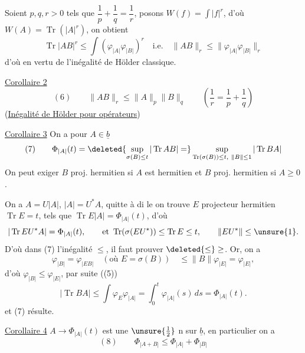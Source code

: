 Soient $p,q,r>0$ tels que $\dfrac1p+\dfrac1q=\dfrac1r$, posons
$W(f)=\int|f|^r$,  d'où
 $W(A)=\operatorname{Tr}(|A|^r)$,
on obtient
\[
\operatorname{Tr}|AB|^r\leq\int(\varphi_{|A|}\varphi_{|B|})^r
\quad\text{i.e.}\quad
\|AB\|_r\leq\|\varphi_{|A|}\varphi_{|B|}\|_r
\]
 d'où en vertu de l'inégalité de Hölder classique.

\uline{Corollaire 2}
\[
(6)\qquad\|AB\|_r\leq\|A\|_p\|B\|_q
\qquad\left(\frac1r=\frac1p+\frac1q\right)
\]
 (\uline{Inégalité de Hölder pour opérateurs})

\uline{Corollaire 3} 
On a pour $A\in\underline b$ 
\[
(7)\qquad\Phi_{|A|}(t)=
\deleted{\sup_{\sigma(B)\leq t}|\operatorname{Tr}AB|=}
\sup_{\operatorname{Tr}(\sigma(B))\leq t,\ \|B\|\leq1}|\operatorname{Tr}BA|
\]
On peut exiger $B$ proj. hermitien  si $A$ est hermitien
et $B$ proj. hermitien si $A\geq0$.

 On a $A=U|A|$, $|A|=U^*A$, quitte à di le  on trouve $E$ projecteur hermitien
$\operatorname{Tr}E=t$, tels que $\operatorname{Tr}E|A|=\Phi_{|A|}(t)$, d'où
\[
|\operatorname{Tr}EU^*A|=\Phi_{|A|}(t),\qquad
\text{et }\operatorname{Tr}(\sigma(EU^*))\leq\operatorname{Tr}E\leq t,
\qquad \|EU^*\|\leq\unsure{1}.
\]
D'où dans (7) l'inégalité $\leq$, il faut prouver $\deleted{\leq}\geq$.
Or, on a 
\[
\varphi_{|B|}=\varphi_{|EB|}
\quad(\text{où }E=\sigma(B))\quad
\leq\|B\|\varphi_{|E|}=\varphi_{|E|},
\]
d'où $\varphi_{|B|}\leq\varphi_{|E|}$, par suite ((5))
\[
|\operatorname{Tr}BA|\leq\int\varphi_E\varphi_{|A|}
=\int_0^t\varphi_{|A|}(s)\,ds=\Phi_{|A|}(t).
\]
et (7) résulte.

\uline{Corollaire 4} 
$A\to\Phi_{|A|}(t)$ est une $\unsure{\frac12}$ n sur $\underline b$,
en  particulier on a
\[
(8)\qquad\Phi_{|A+B|}\leq\Phi_{|A|}+\Phi_{|B|}
\]
